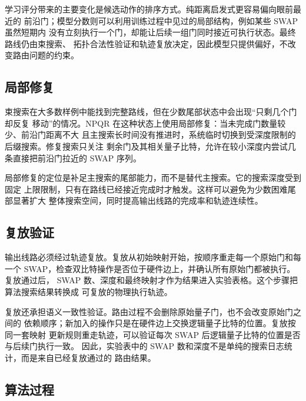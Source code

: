 学习评分带来的主要变化是候选动作的排序方式。纯距离启发式更容易偏向眼前最近的
前沿门；模型分数则可以利用训练过程中见过的局部结构，例如某些 SWAP 虽然短期内
没有立刻执行一个门，却能让后续一组门同时接近可执行状态。最终路线仍由束搜索、
拓扑合法性验证和轨迹复放决定，因此模型只提供偏好，不改变路由问题的约束。

\subsection{局部修复}

束搜索在大多数样例中能找到完整路线，但在少数尾部状态中会出现“只剩几个门却反复
移动”的情况。NPQR 在这种状态上使用局部修复：当未完成门数量较少、前沿门距离不大
且主搜索长时间没有推进时，系统临时切换到受深度限制的后缀搜索。修复搜索只关注
剩余门及其相关量子比特，允许在较小深度内尝试几条直接把前沿门拉近的 SWAP 序列。

局部修复的定位是补足主搜索的尾部能力，而不是替代主搜索。它的搜索深度受到固定
上限限制，只有在路线已经接近完成时才触发。这样可以避免为少数困难尾部显著扩大
整体搜索空间，同时提高输出线路的完成率和轨迹连续性。

\subsection{复放验证}

输出线路必须经过轨迹复放。复放从初始映射开始，按顺序重走每一个原始门和每一个
SWAP，检查双比特操作是否位于硬件边上，并确认所有原始门都被执行。复放通过后，
SWAP 数、深度和最终映射才作为结果进入实验表格。这个步骤把算法搜索结果转换成
可复放的物理执行轨迹。

复放还承担语义一致性验证。路由过程不会删除原始量子门，也不会改变原始门之间的
依赖顺序；新加入的操作只是在硬件边上交换逻辑量子比特的位置。复放按同一套映射
更新规则重走轨迹，可以验证每次 SWAP 后逻辑量子比特的位置是否与后续门执行一致。
因此，实验表中的 SWAP 数和深度不是单纯的搜索日志统计，而是来自已经复放通过的
路由结果。

\subsection{算法过程}

